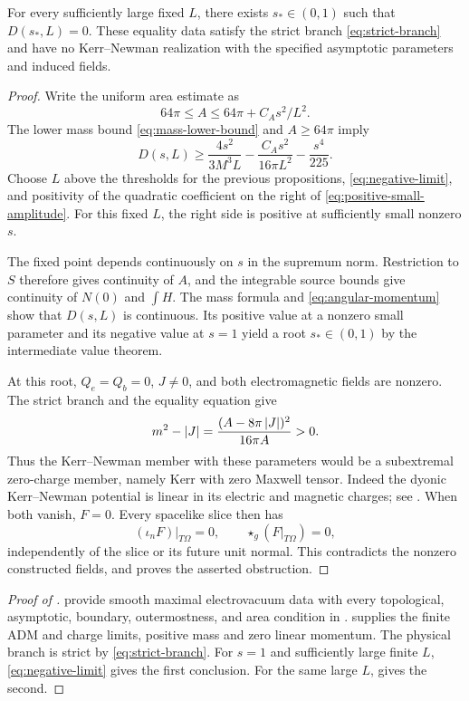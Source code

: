 \begin{proposition}\label{prop:equality}
For every sufficiently large fixed \(L\), there exists \(s_*\in(0,1)\)
such that \(D(s_*,L)=0\). These equality data satisfy the strict branch
\eqref{eq:strict-branch} and have no Kerr--Newman realization with the
specified asymptotic parameters and induced fields.
\end{proposition}

\begin{proof}
Write the uniform area estimate as
\[
 64\pi\le A\le64\pi+C_A s^2/L^2.
\]
The lower mass bound \eqref{eq:mass-lower-bound} and \(A\ge64\pi\) imply
\begin{equation}\label{eq:positive-small-amplitude}
 D(s,L)\ge
 \frac{4s^2}{3M^3L}-\frac{C_A s^2}{16\pi L^2}-\frac{s^4}{225}.
\end{equation}
Choose \(L\) above the thresholds for the previous propositions,
\eqref{eq:negative-limit}, and positivity of the quadratic coefficient
on the right of \eqref{eq:positive-small-amplitude}. For this fixed \(L\),
the right side is positive at sufficiently small nonzero \(s\).

The fixed point depends continuously on \(s\) in the supremum norm.
Restriction to \(S\) therefore gives continuity of \(A\), and the
integrable source bounds give continuity of \(N(0)\) and \(\int H\).
The mass formula and \eqref{eq:angular-momentum} show that \(D(s,L)\) is
continuous. Its positive value at a nonzero small parameter and its
negative value at \(s=1\) yield a root \(s_*\in(0,1)\) by the
intermediate value theorem.

At this root, \(Q_e=Q_b=0\), \(J\ne0\), and both electromagnetic fields
are nonzero. The strict branch and the equality equation give
\begin{equation}\label{eq:subextremality}
 m^2-\left\lvert J\right\rvert=\frac{(A-8\pi\left\lvert J\right\rvert)^2}{16\pi A}>0.
\end{equation}
Thus the Kerr--Newman member with these parameters would be a
subextremal zero-charge member, namely Kerr with zero Maxwell tensor.
Indeed the dyonic Kerr--Newman potential is linear in its electric and
magnetic charges; see \cite[Equation~(3)]{CKST2018}. When both vanish,
\(F=0\). Every spacelike slice then has
\[
 (\iota_nF)|_{T\Omega}=0,\qquad
 \star_g(F|_{T\Omega})=0,
\]
independently of the slice or its future unit normal. This contradicts
the nonzero constructed fields, and proves the asserted obstruction.
\end{proof}

\begin{proof}[Proof of ]
provide smooth maximal electrovacuum data with every topological,
asymptotic, boundary, outermostness, and area condition in
.  supplies the finite ADM and
charge limits, positive mass and zero linear momentum. The physical branch
is strict by \eqref{eq:strict-branch}. For \(s=1\) and sufficiently large
finite \(L\), \eqref{eq:negative-limit} gives the first conclusion.
For the same large \(L\),  gives the second.
\end{proof}
